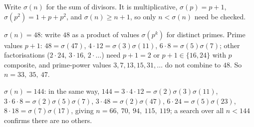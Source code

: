 Write $\sigma(n)$ for the sum of divisors. It is multiplicative, $\sigma(p)=p+1$, $\sigma\left(p^2\right)=1+p+p^2$, and $\sigma(n)\ge n+1$, so only $n<\sigma(n)$ need be checked.

$\sigma(n)=48$: write $48$ as a product of values $\sigma\left(p^k\right)$ for distinct primes. Prime values $p+1$: $48=\sigma(47)$, $4\cdot12=\sigma(3)\sigma(11)$, $6\cdot8=\sigma(5)\sigma(7)$; other factorisations ($2\cdot24$, $3\cdot16$, $2\cdot\ldots$) need $p+1=2$ or $p+1\in\{16,24\}$ with $p$ composite, and prime-power values $3,7,13,15,31,\dots$ do not combine to $48$. So $n=\boxed{33,\ 35,\ 47}$.

$\sigma(n)=144$: in the same way, $144=3\cdot4\cdot12=\sigma(2)\sigma(3)\sigma(11)$, $3\cdot6\cdot8=\sigma(2)\sigma(5)\sigma(7)$, $3\cdot48=\sigma(2)\sigma(47)$, $6\cdot24=\sigma(5)\sigma(23)$, $8\cdot18=\sigma(7)\sigma(17)$, giving $n=\boxed{66,\ 70,\ 94,\ 115,\ 119}$; a search over all $n<144$ confirms there are no others.
